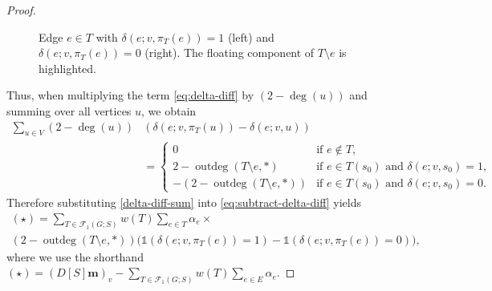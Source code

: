 \documentclass[12pt]{amsart}
\theoremstyle{definition}
\newcommand{\one}{\mathds{1}}
\newcommand{\boldm}{\mathbf{m}}
\newcommand{\trees}{\mathcal{F}_1}
\DeclareMathOperator{\outdeg}{outdeg}
\begin{document}
\begin{proof}
\begin{figure}[h]
\begin{minipage}{0.45\textwidth}
\end{minipage}
\begin{minipage}{0.45\textwidth}
\centering
\end{minipage}
\caption{Edge $e \in T$ with $\delta(e; v, \pi_T(e)) = 1$ (left) and $\delta(e; v, \pi_T(e)) = 0$ (right). The floating component of $T \setminus e$ is highlighted.}
\label{fig:e-delete-from-forest}
\end{figure}

Thus, when multiplying the term \eqref{eq:delta-diff} by $(2 - \deg(u))$ and summing over all vertices $u$, we obtain
\begin{align}
	\sum_{u \in V} (2 - \deg(u)) &\left(\delta(e; v, \pi_T(u)) - \delta(e; v, u)\right) \\
	&= \begin{cases}
	0 &\text{if } e \not \in T, \\
	2 - \outdeg(T \setminus e, *) &\text{if } e \in T(s_0) \text{ and } \delta(e; v, s_0) = 1, \\
	-(2 - \outdeg(T \setminus e, *)) &\text{if } e \in T(s_0) \text{ and } \delta(e; v, s_0) = 0 .
	\end{cases} \label{delta-diff-sum}
\end{align}
Therefore substituting \eqref{delta-diff-sum} into \eqref{eq:subtract-delta-diff} yields
\begin{multline}\label{eq:45}
	(\star)
	= \sum_{T\in \trees(G;S)} \! w({T}) \sum_{e \in T} \alpha_e \times \\
	( 2 - \outdeg(T\setminus e,*)) \Big( \one(\delta(e; v, \pi_T(e)) = 1) \! - \one(\delta(e; v, \pi_T(e)) = 0) \Big),
\end{multline}
where we use the shorthand
$\displaystyle
	(\star) = (D[S] \boldm)_v - \sum_{T \in \trees(G;S)} w({T}) \sum_{e \in E} \alpha_e.
$


\end{proof}
\end{document}
